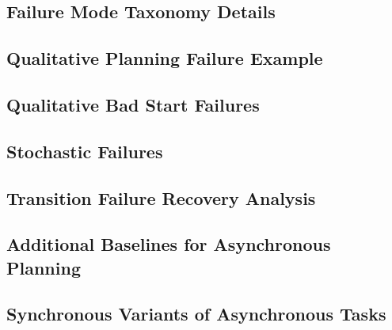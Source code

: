\subsection{Failure Mode Taxonomy Details}
\label{app:taxonomy-details}


% 

\subsection{Qualitative Planning Failure Example}
\label{app:qualitative-planning}


\subsection{Qualitative Bad Start Failures}
\label{app:qualitative-bad-starts}


\subsection{Stochastic Failures}
\label{app:stochasticity}


\subsection{Transition Failure Recovery Analysis}
\label{app:unlikely-repeat}


\subsection{Additional Baselines for Asynchronous Planning}
\label{app:async-baselines}


% 

\subsection{Synchronous Variants of Asynchronous Tasks}
\label{app:async-sync-task-comparison}


% 